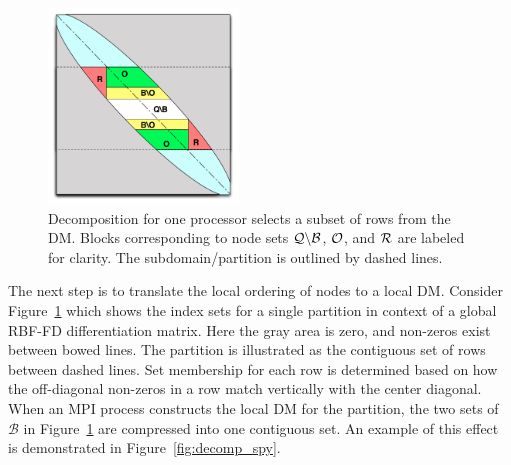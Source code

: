 \documentclass{report}
\begin{document}
\begin{figure}
\begin{center}
\includegraphics[width=0.45\textwidth]{rbffd_methods_content/decompositions/MatrixDecompositionSets_RBF-FD_Bowed.pdf} 
\caption{Decomposition for one processor selects a subset of rows from the DM. Blocks corresponding to node sets $\mathcal{Q} \backslash \mathcal{B}$, $\mathcal{O}$, and $\mathcal{R}$ are labeled for clarity. The subdomain/partition is outlined by dashed lines.}
\label{fig:decomp_matrix_view}
\end{center}
\end{figure}

The next step is to translate the local ordering of nodes to a local DM. Consider Figure~\ref{fig:decomp_matrix_view} which shows the index sets for a single partition in context of a global RBF-FD differentiation matrix. Here the gray area is zero, and non-zeros exist between bowed lines. The partition is illustrated as the contiguous set of rows between dashed lines. Set membership for each row is determined based on how the off-diagonal non-zeros in a row match vertically with the center diagonal. When an MPI process constructs the local DM for the partition, the two sets of $\mathcal{B}$ in Figure~\ref{fig:decomp_matrix_view} are compressed into one contiguous set. An example of this effect is demonstrated in Figure~\ref{fig:decomp_spy}. 
\end{document}

